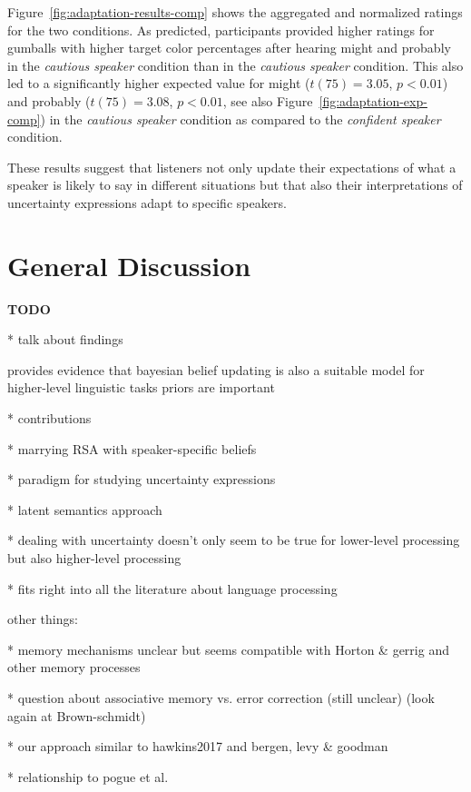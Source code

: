 \documentclass[lucida,biblatex]{sp} %
\begin{document}
Figure~\ref{fig:adaptation-results-comp} shows the aggregated and normalized ratings for the two conditions.  As predicted, participants provided higher ratings for gumballs with higher target color percentages after hearing {\sc might} and {\sc probably} in the \emph{cautious speaker} condition than in the \emph{cautious speaker} condition. This also led to a significantly higher expected value for {\sc might} ($t(75)=3.05$, $p<0.01$) and {\sc probably} ($t(75)=3.08$, $p<0.01$, see also Figure~\ref{fig:adaptation-exp-comp}) in the \emph{cautious speaker} condition as compared to the \emph{confident speaker} condition.

These results suggest that listeners not only update their expectations of what a speaker is likely to say in different situations but that also their interpretations of uncertainty expressions adapt to specific speakers.


\section{General Discussion}

{\bf TODO} 

* talk about findings

provides evidence that bayesian belief updating is also a suitable model for higher-level linguistic tasks
priors are important




* contributions
	
	* marrying RSA with speaker-specific beliefs
	
	 * paradigm for studying uncertainty expressions
	
	 * latent semantics approach

 	 * dealing with uncertainty doesn't only seem to be true for lower-level processing but also higher-level processing
	 
	  * fits right into all the literature about language processing
	
	other things:
	
	*  memory mechanisms unclear but seems compatible with Horton \& gerrig and other memory processes
	
	* question about associative memory vs. error correction (still unclear) (look again at Brown-schmidt)
	
 	*  our approach similar to hawkins2017 and bergen, levy \& goodman
	
	*  relationship to pogue et al.
	
\end{document}
